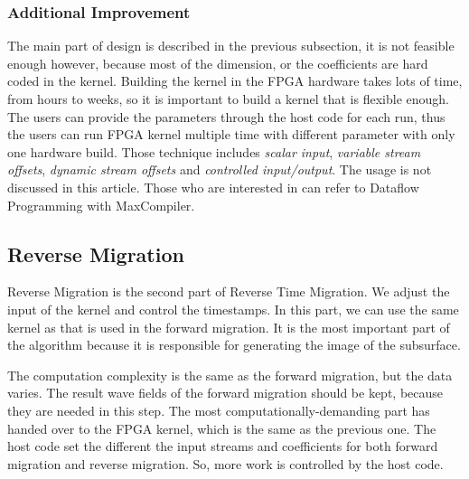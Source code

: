 \subsubsection{Additional Improvement} %
The main part of design is described in the previous subsection, it is not
feasible enough however, because most of the dimension, or the coefficients
are hard coded in the kernel. Building the kernel in the FPGA hardware
takes lots of time, from hours to weeks, so it is important to build a
kernel that is flexible enough. The users can provide the parameters
through the host code for each run, thus the users can run FPGA kernel
multiple time with different parameter with only one hardware build. Those
technique includes \emph{scalar input}, \emph{variable stream offsets},
\emph{dynamic stream offsets} and \emph{controlled input/output}. The usage
is not discussed in this article. Those who are interested in can refer to
Dataflow Programming with MaxCompiler\cite{maxcompiler_tutorial}.

\label{ssub:Additional improvement}



\subsection{Reverse Migration} %

Reverse Migration is the second part of Reverse Time Migration. We adjust
the input of the kernel and control the timestamps. In this part, we can
use the same kernel as that is used in the forward migration. It is the 
most important part of the algorithm because it is responsible for 
generating the image of the subsurface. 

The computation complexity is the same as the forward migration, but the 
data varies. The result wave fields of the forward migration should be 
kept, because they are needed in this step. The most 
computationally-demanding part has handed over to the FPGA kernel, which is 
the same as the previous one. The host code set the different the input 
streams and coefficients for both forward migration and reverse migration. 
So, more work is controlled by the host code.

\label{sub:Reverse Mi}

